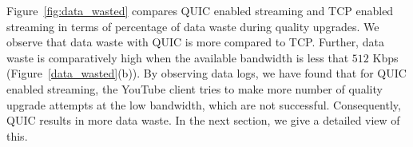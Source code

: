 Figure~\ref{fig:data_wasted} compares QUIC enabled streaming and TCP enabled streaming in terms of percentage of data waste during quality upgrades. 
We observe that data waste with QUIC is more compared to TCP. Further, data waste is comparatively high when the available bandwidth is less that $512$ Kbps (Figure~\ref{data_wasted}(b)). 
By observing data logs, we have found that for QUIC enabled streaming, the YouTube client tries to make more number of quality upgrade attempts at the low bandwidth, which are not successful. 
Consequently, QUIC results in more data waste. In the next section, we give a detailed view of this. 


